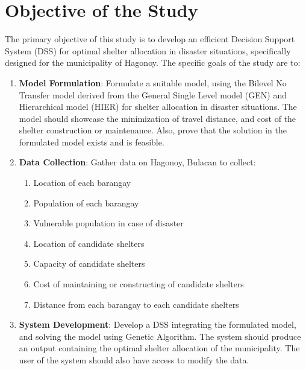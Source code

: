 \section{Objective of the Study}

The primary objective of this study is to develop an efficient Decision Support System (DSS) for optimal shelter allocation in disaster situations, specifically designed for the municipality of Hagonoy. The specific goals of the study are to:

\begin{enumerate}
	\item \textbf{Model Formulation}: Formulate a suitable model, using the Bilevel No Transfer model derived from the General Single Level model (GEN) and Hierarchical model (HIER) for shelter allocation in disaster situations. The model should showcase the minimization of travel distance, and cost of the shelter construction or maintenance. Also, prove that the solution in the formulated model exists and is feasible.
	
	\item \textbf{Data Collection}: Gather data on Hagonoy, Bulacan to collect:
	\begin{enumerate}
		\item Location of each barangay
		\item Population of each barangay 
		\item Vulnerable population in case of disaster 
		\item Location of candidate shelters
		\item Capacity of candidate shelters 
		\item Cost of maintaining or constructing of candidate shelters 
		\item Distance from each barangay to each candidate shelters 
	\end{enumerate}
	
	\item \textbf{System Development}: Develop a DSS integrating the formulated model, and solving the model using Genetic Algorithm. The system should produce an output containing the optimal shelter allocation of the municipality. The user of the system should also have access to modify the data.
	
\end{enumerate}